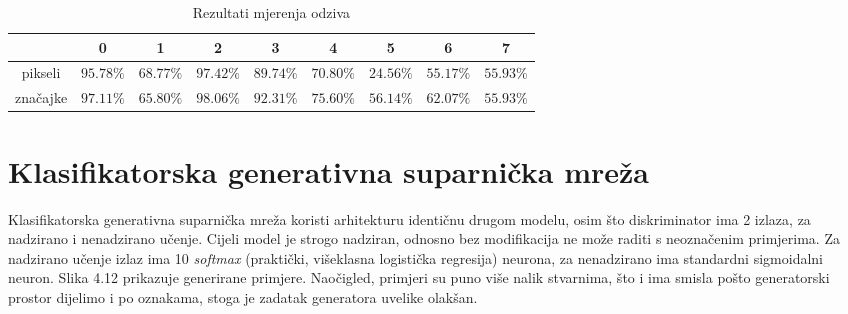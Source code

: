 \documentclass[times, utf8, diplomski]{fer}
\begin{document}
\begin{table}[H]
\caption{Rezultati mjerenja odziva}
\small
\centering
\begin{tabular}{c c c c c c c c c}
\hline\hline %
  & 0 & 1  & 2 & 3 & 4 & 5 & 6 & 7 \\ [0.5ex] 
\hline %
pikseli & $95.78\%$ & $68.77\%$ & $97.42\%$ & $89.74\%$ & $70.80\%$ & $24.56\%$ & $55.17\%$ & $55.93\%$ \\
značajke & $97.11\%$ & $65.80\%$ & $98.06\%$ & $92.31\%$ & $75.60\%$ & $56.14\%$ & $62.07\%$ & $55.93\%$ \\ [1ex] %
\hline %
\end{tabular}
\end{table}

\section{Klasifikatorska generativna suparnička mreža}
Klasifikatorska generativna suparnička mreža koristi arhitekturu identičnu drugom modelu, osim što diskriminator ima 2 izlaza, za nadzirano i nenadzirano učenje. Cijeli model je strogo nadziran, odnosno bez modifikacija ne može raditi s neoznačenim primjerima. Za nadzirano učenje izlaz ima 10 \textit{softmax} (praktički, višeklasna logistička regresija) neurona, za nenadzirano ima standardni sigmoidalni neuron. Slika 4.12 prikazuje generirane primjere. Naočigled, primjeri su puno više nalik stvarnima, što i ima smisla pošto generatorski prostor dijelimo i po oznakama, stoga je zadatak generatora uvelike olakšan. \par
\end{document}
